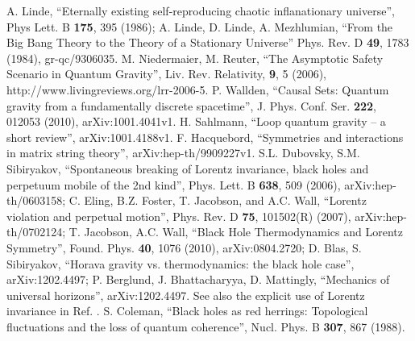 \documentclass{article}
\begin{document}
\begin{thebibliography}{99}
A. Linde, ``Eternally existing self-reproducing chaotic inflanationary universe'', Phys Lett. B \textbf{175}, 395 (1986);
A. Linde, D. Linde, A. Mezhlumian, ``From the Big Bang Theory to the Theory of a Stationary Universe'' Phys. Rev. D \textbf{49}, 1783 (1984), gr-qc/9306035.
M. Niedermaier, M. Reuter, ``The Asymptotic Safety Scenario in Quantum Gravity'', Liv. Rev. Relativity, \textbf{9}, 5 (2006), http://www.livingreviews.org/lrr-2006-5.
P. Wallden, ``Causal Sets: Quantum gravity from a fundamentally discrete spacetime'', J. Phys. Conf. Ser. \textbf{222}, 012053 (2010), 	arXiv:1001.4041v1.
H. Sahlmann, ``Loop quantum gravity -- a short review'', arXiv:1001.4188v1.
F. Hacquebord, ``Symmetries and interactions in matrix string theory'', arXiv:hep-th/9909227v1.
S.L. Dubovsky, S.M. Sibiryakov, ``Spontaneous breaking of Lorentz invariance, black holes and perpetuum mobile of the 2nd kind'', Phys. Lett. B \textbf{638}, 509 (2006), arXiv:hep-th/0603158; C. Eling, B.Z. Foster, T. Jacobson, and A.C. Wall, ``Lorentz violation and perpetual motion'', Phys. Rev. D \textbf{75}, 101502(R) (2007), arXiv:hep-th/0702124; T. Jacobson, A.C. Wall, ``Black Hole Thermodynamics and Lorentz Symmetry'', Found. Phys. \textbf{40}, 1076 (2010), arXiv:0804.2720; D. Blas, S. Sibiryakov, ``Horava gravity vs. thermodynamics: the black hole case'',  arXiv:1202.4497; P. Berglund, J. Bhattacharyya, D. Mattingly, ``Mechanics of universal horizons'', arXiv:1202.4497.  See also the explicit use of Lorentz invariance in Ref. \cite{myproofs}.
S. Coleman, ``Black holes as red herrings: Topological fluctuations and the loss of quantum coherence'', Nucl. Phys. B \textbf{307}, 867 (1988).
\end{thebibliography}
\end{document}
